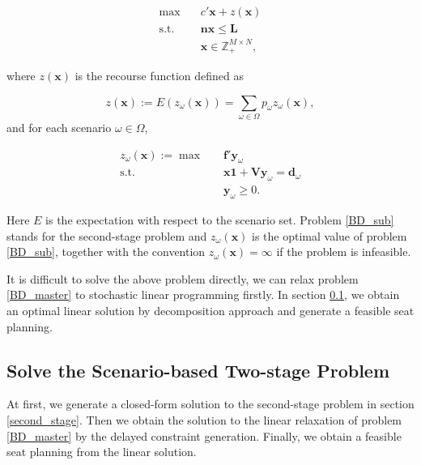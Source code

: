\begin{equation}\label{BD_master}
  \begin{aligned}
\max \quad & c{'} \mathbf{x}+ z(\mathbf{x}) \\
\text {s.t.} \quad & \mathbf{n} \mathbf{x} \leq \mathbf{L} \\
& \mathbf{x} \in \mathbb{Z}_{+}^{M \times N},
\end{aligned}
\end{equation}

where $z(\mathbf{x})$ is the recourse function defined as 

$$z(\mathbf{x}) := E(z_{\omega}(\mathbf{x})) = \sum_{\omega \in \Omega} p_{\omega} z_{\omega}(\mathbf{x}),$$ and for each scenario $\omega \in \Omega$, 

\begin{equation}\label{BD_sub}
  \begin{aligned}
    z_{\omega}(\mathbf{x}) := \max \quad & \mathbf{f}{'} \mathbf{y}_{\omega} \\
    \text {s.t.} \quad & \mathbf{x} \mathbf{1} + \mathbf{V} \mathbf{y}_{\omega} = \mathbf{d}_{\omega} \\
     & \mathbf{y}_{\omega} \geq 0.
  \end{aligned}
  \end{equation}


Here $E$ is the expectation with respect to the scenario set. Problem \eqref{BD_sub} stands for the second-stage problem and $z_{\omega}(\mathbf{x})$ is the optimal value of problem \eqref{BD_sub}, together with the convention $z_{\omega}(\mathbf{x}) = \infty$ if the problem is infeasible.

It is difficult to solve the above problem directly, we can relax problem \eqref{BD_master} to stochastic linear programming firstly. In section \ref{solve_by_benders}, we obtain an optimal linear solution by decomposition approach and generate a feasible seat planning.

\subsection{Solve the Scenario-based Two-stage Problem}\label{solve_by_benders}

At first, we generate a closed-form solution to the second-stage problem in section \ref{second_stage}. Then we obtain the solution to the linear relaxation of problem \eqref{BD_master} by the delayed constraint generation. Finally, we obtain a feasible seat planning from the linear solution.


